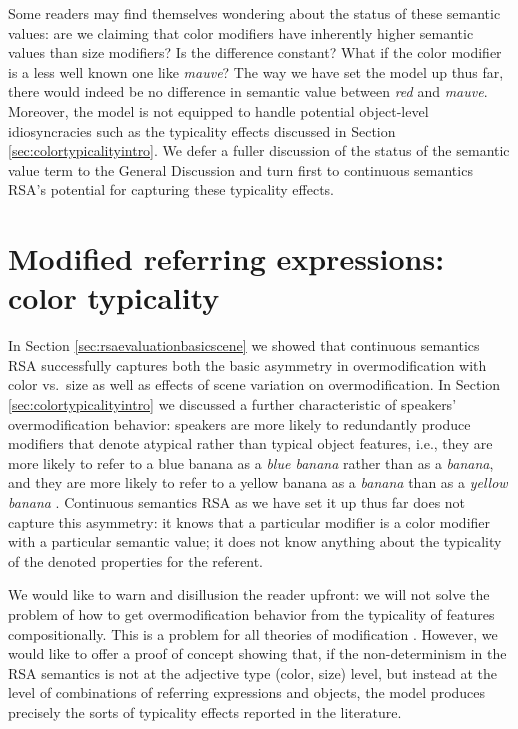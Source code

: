 \documentclass[11pt]{article}
\newcommand{\sectionref}[1]{Section \ref{#1}}
\begin{document}
Some readers may find themselves wondering about the status of these semantic values: are we claiming that color modifiers have inherently higher semantic values than size modifiers? Is the difference constant? What if the color modifier is a less well known one like \emph{mauve}? The way we have set the model up thus far, there would indeed be no difference in semantic value between \emph{red} and \emph{mauve}. Moreover, the model is not equipped to handle potential object-level idiosyncracies such as the typicality effects discussed in \sectionref{sec:colortypicalityintro}. We defer a fuller discussion of the status of the semantic value term to the General Discussion and turn first to continuous semantics RSA's potential for capturing these typicality effects.


\section{Modified referring expressions: color typicality}
\label{sec:colortypicality}


In \sectionref{sec:rsaevaluationbasicscene} we showed that continuous semantics RSA successfully captures both the basic asymmetry in overmodification with color vs.~size as well as effects of scene variation on overmodification. In \sectionref{sec:colortypicalityintro} we discussed a further characteristic of speakers' overmodification behavior: speakers are more likely to redundantly produce modifiers that denote atypical rather than typical object features, i.e., they are more likely to refer to a blue banana as a \emph{blue banana} rather than as a \emph{banana}, and they are more likely to refer to a yellow banana as a \emph{banana} than as a \emph{yellow banana} \cite{sedivy2003a, Westerbeek2015}. Continuous semantics RSA as we have set it up thus far does not capture this asymmetry: it knows that a particular modifier is a color modifier with a particular semantic value; it does not know anything about the typicality of the denoted properties for the referent. 

We would like to warn and disillusion the reader upfront: we will not solve the problem of how to get overmodification behavior from the typicality of features compositionally. This is a problem for all theories of modification \cite{kamp1995}. However, we would like to offer a proof of concept showing that, if the non-determinism in the RSA semantics is not at the adjective type (color, size) level, but instead at the level of combinations of referring expressions and objects, the model produces precisely the sorts of typicality effects reported in the literature. 
\end{document}
